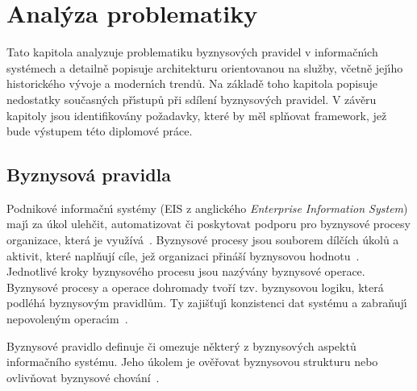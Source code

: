 
\chapter{Anal\'yza problematiky}\label{ch:analyza}

Tato kapitola analyzuje problematiku byznysov\'ych pravidel v informačn\'{\i}ch systémech
a detailně popisuje architekturu orientovanou na služby, včetně jej\'{\i}ho historického
v\'yvoje a modern\'{\i}ch trendů. Na základě toho kapitola popisuje nedostatky
současn\'ych př\'{\i}stupů při sdílení byznysových pravidel. V závěru kapitoly jsou
identifikovány požadavky, které by měl splňovat framework, jež bude v\'ystupem této diplomové práce.

\section{Byznysová pravidla}\label{sec:business-rules}

Podnikové informačn\'{\i} systémy (\gls{EIS} z anglického \textit{Enterprise Information System})
maj\'{\i} za úkol ulehčit, automatizovat či poskytovat podporu pro byznysové procesy organizace,
která je využívá~\cite{dumas2005process}. Byznysové procesy jsou souborem dílčích úkolů
a aktivit, které naplňují cíle, jež organizaci přináší byznysovou hodnotu~\cite{weske2012business}.
Jednotlivé kroky byznysového procesu jsou nazývány byznysové operace. Byznysové procesy a operace dohromady
tvoří tzv. byznysovou logiku, která podléhá byznysov\'ym pravidlům. Ty zajišťuj\'{\i} konzistenci dat
systému a zabraňuj\'{\i} nepovolen\'ym operac\'{\i}m~\cite{cemus2015automated}.

\begin{definition}
    Byznysové pravidlo definuje či omezuje některý z byznysových aspektů informačního systému.
    Jeho úkolem je ověřovat byznysovou strukturu nebo ovlivňovat byznysové chování~\cite{morgan2002business}.
\end{definition}


